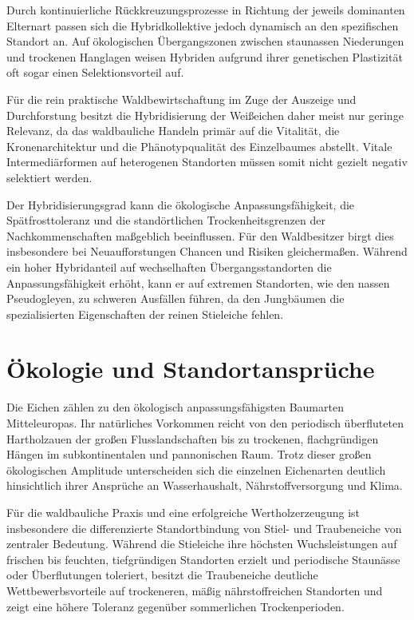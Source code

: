 \documentclass[twocolumn, bibliography=totoc, abstract=true]{scrartcl}
\begin{document}
Durch kontinuierliche Rückkreuzungsprozesse in Richtung der jeweils dominanten Elternart passen sich die Hybridkollektive jedoch dynamisch an den spezifischen Standort an. Auf ökologischen Übergangszonen zwischen staunassen Niederungen und trockenen Hanglagen weisen Hybriden aufgrund ihrer genetischen Plastizität oft sogar einen Selektionsvorteil auf.

Für die rein praktische Waldbewirtschaftung im Zuge der Auszeige und Durchforstung besitzt die Hybridisierung der Weißeichen daher meist nur geringe Relevanz, da das waldbauliche Handeln primär auf die Vitalität, die Kronenarchitektur und die Phänotypqualität des Einzelbaumes abstellt. Vitale Intermediärformen auf heterogenen Standorten müssen somit nicht gezielt negativ selektiert werden. 

Der Hybridisierungsgrad kann die ökologische Anpassungsfähigkeit, die Spätfrosttoleranz und die standörtlichen Trockenheitsgrenzen der Nachkommenschaften maßgeblich beeinflussen. Für den Waldbesitzer birgt dies insbesondere bei Neuaufforstungen Chancen und Risiken gleichermaßen. Während ein hoher Hybridanteil auf wechselhaften Übergangsstandorten die Anpassungsfähigkeit erhöht, kann er auf extremen Standorten, wie den nassen Pseudogleyen, zu schweren Ausfällen führen, da den Jungbäumen die spezialisierten Eigenschaften der reinen Stieleiche fehlen.


\section{Ökologie und Standortansprüche}

Die Eichen zählen zu den ökologisch anpassungsfähigsten Baumarten Mitteleuropas. Ihr natürliches Vorkommen reicht von den periodisch überfluteten Hartholzauen der großen Flusslandschaften bis zu trockenen, flachgründigen Hängen im subkontinentalen und pannonischen Raum. Trotz dieser großen ökologischen Amplitude unterscheiden sich die einzelnen Eichenarten deutlich hinsichtlich ihrer Ansprüche an Wasserhaushalt, Nährstoffversorgung und Klima.

Für die waldbauliche Praxis und eine erfolgreiche Wertholzerzeugung ist insbesondere die differenzierte Standortbindung von Stiel- und Traubeneiche von zentraler Bedeutung. Während die Stieleiche ihre höchsten Wuchsleistungen auf frischen bis feuchten, tiefgründigen Standorten erzielt und periodische Staunässe oder Überflutungen toleriert, besitzt die Traubeneiche deutliche Wettbewerbsvorteile auf trockeneren, mäßig nährstoffreichen Standorten und zeigt eine höhere Toleranz gegenüber sommerlichen Trockenperioden.
\end{document}
